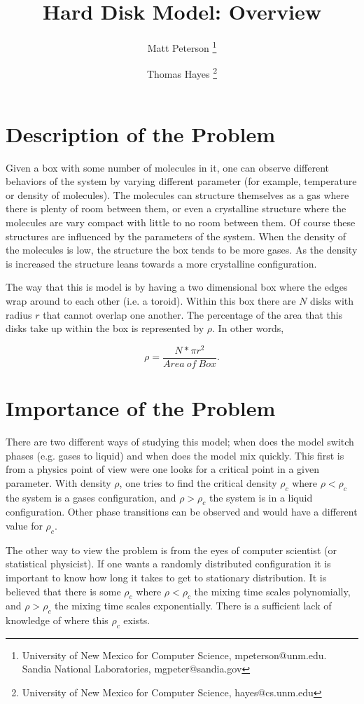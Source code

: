 \documentclass[a4paper,11pt]{article}
\title{Hard Disk Model: Overview}
\author{Matt Peterson \thanks{University of New Mexico for Computer Science, mpeterson@unm.edu. Sandia National Laboratories, mgpeter@sandia.gov} \and Thomas Hayes \thanks{University of New Mexico for Computer Science, hayes@cs.unm.edu}}
\begin{document}
\maketitle

\section*{Description of the Problem}

Given a box with some number of molecules in it, one can observe different behaviors of the system by varying different parameter (for example, temperature or density of molecules).  The molecules can structure themselves as a gas where there is plenty of room between them, or even a crystalline structure where the molecules are vary compact with little to no room between them.  Of course these structures are influenced by the parameters of the system.  When the density of the molecules is low, the structure the box tends to be more gases.  As the density is increased the structure leans towards a more crystalline configuration.

The way that this is model is by having a two dimensional box where the edges wrap around to each other (i.e. a toroid).  Within this box there are $N$ disks with radius $r$ that cannot overlap one another.  The percentage of the area that this disks take up within the box is represented by $\rho$.  In other words,

\begin{displaymath}
  \rho = \frac{N*\pi r^2}{Area\ of\ Box}.
\end{displaymath}


\section*{Importance of the Problem}

There are two different ways of studying this model; when does the model switch phases (e.g. gases to liquid) and when does the model mix quickly.  This first is from a physics point of view were one looks for a critical point in a given parameter.  With density $\rho$, one tries to find the critical density $\rho_c$ where $\rho < \rho_c$ the system is a gases configuration, and $\rho > \rho_c$ the system is in a liquid configuration. Other phase transitions can be observed and would have a different value for $\rho_c$.

The other way to view the problem is from the eyes of computer scientist (or statistical physicist).  If one wants a randomly distributed configuration it is important to know how long it takes to get to stationary distribution.  It is believed that there is some $\rho_c$ where $\rho < \rho_c$ the mixing time scales polynomially, and $\rho > \rho_c$ the mixing time scales exponentially.  There is a sufficient lack of knowledge of where this $\rho_c$ exists.
\end{document}
